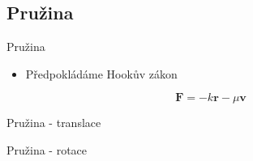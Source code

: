 \documentclass[aspectratio=169,xcolor=dvipsnames]{beamer}
\begin{document}
\subsection{Pružina}
\begin{frame}{Pružina}
  \begin{itemize}
    \item Předpokládáme Hookův zákon
  \end{itemize}
  \begin{equation}
    \mathbf{F} = -k\mathbf{r} - \mu\mathbf{v}
  \end{equation}
  \vspace{0.25cm}
  \cite{kopcil_trejbalova}
  \cite{kiesslich_2d_physics}
\end{frame}
\begin{frame}{Pružina - translace}
\end{frame}
\begin{frame}{Pružina - rotace}
\end{frame}
\end{document}
